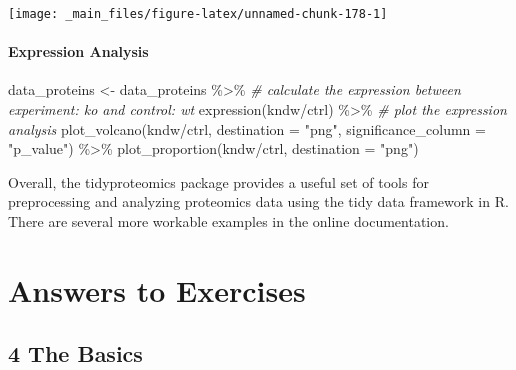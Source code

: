 \documentclass[
]{book}
\newenvironment{Shaded}{\begin{snugshade}}{\end{snugshade}}
\newcommand{\AttributeTok}[1]{\textcolor[rgb]{0.77,0.63,0.00}{#1}}
\newcommand{\CommentTok}[1]{\textcolor[rgb]{0.56,0.35,0.01}{\textit{#1}}}
\newcommand{\FunctionTok}[1]{\textcolor[rgb]{0.00,0.00,0.00}{#1}}
\newcommand{\NormalTok}[1]{#1}
\newcommand{\OtherTok}[1]{\textcolor[rgb]{0.56,0.35,0.01}{#1}}
\newcommand{\SpecialCharTok}[1]{\textcolor[rgb]{0.00,0.00,0.00}{#1}}
\newcommand{\StringTok}[1]{\textcolor[rgb]{0.31,0.60,0.02}{#1}}
\begin{document}
\begin{center}\texttt{[image: \_main\_files/figure-latex/unnamed-chunk-178-1]} \end{center}

\hypertarget{expression-analysis}{%
\subsubsection*{Expression Analysis}\label{expression-analysis}}

\begin{Shaded}
\begin{Highlighting}[]
\NormalTok{data\_proteins }\OtherTok{\textless{}{-}}\NormalTok{ data\_proteins }\SpecialCharTok{\%\textgreater{}\%}
  \CommentTok{\# calculate the expression between experiment: ko and control: wt}
  \FunctionTok{expression}\NormalTok{(kndw}\SpecialCharTok{/}\NormalTok{ctrl) }\SpecialCharTok{\%\textgreater{}\%}
  \CommentTok{\# plot the expression analysis}
  \FunctionTok{plot\_volcano}\NormalTok{(kndw}\SpecialCharTok{/}\NormalTok{ctrl, }\AttributeTok{destination =} \StringTok{"png"}\NormalTok{, }\AttributeTok{significance\_column =} \StringTok{"p\_value"}\NormalTok{) }\SpecialCharTok{\%\textgreater{}\%} 
  \FunctionTok{plot\_proportion}\NormalTok{(kndw}\SpecialCharTok{/}\NormalTok{ctrl, }\AttributeTok{destination =} \StringTok{"png"}\NormalTok{)}
\end{Highlighting}
\end{Shaded}

Overall, the tidyproteomics package provides a useful set of tools for preprocessing and analyzing proteomics data using the tidy data framework in R. There are several more workable examples in the online documentation.

\hypertarget{answers-to-exercises}{%
\chapter*{Answers to Exercises}\label{answers-to-exercises}}

\hypertarget{the-basics}{%
\section*{\texorpdfstring{\textbf{4} The Basics}{4 The Basics}}\label{the-basics}}
\end{document}
